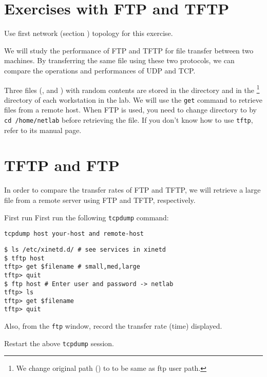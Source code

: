 \documentclass{../UTNetLab}
\begin{document}
\section*{Exercises with FTP and TFTP}
	Use first network (section ) topology for this exercise.

	We will study the performance of FTP and TFTP for file transfer between two machines.
	By transferring the same file using these two protocols, we can compare the operations and performances of UDP and TCP. 

	Three files (,  and ) with random contents are stored in the  directory and in the \footnote{We change original path () to  to be same as ftp user path.} directory of each workstation in the lab.
	We will use the \lstinline{get} command to retrieve files from a remote host.
	When FTP is used, you need to change directory to  by \lstinline{cd /home/netlab} before retrieving the file.
	If you don’t know how to use \lstinline{tftp}, refer to its manual page.


\section{TFTP and FTP}
	In order to compare the transfer rates of FTP and TFTP, we will retrieve a large file from a remote server using FTP and TFTP, respectively.

	First run First run the following \lstinline{tcpdump} command:
	\begin{lstlisting}
tcpdump host your-host and remote-host
	\end{lstlisting}
	\begin{lstlisting}[emph={host}]
$ ls /etc/xinetd.d/ # see services in xinetd
$ tftp host
tftp> get $filename # small,med,large
tftp> quit
$ ftp host # Enter user and password -> netlab
tftp> ls
tftp> get $filename
tftp> quit
	\end{lstlisting}

	Also, from the \lstinline{ftp} window, record the transfer rate (time) displayed. 

	Restart the above \lstinline{tcpdump} session.
\end{document}
